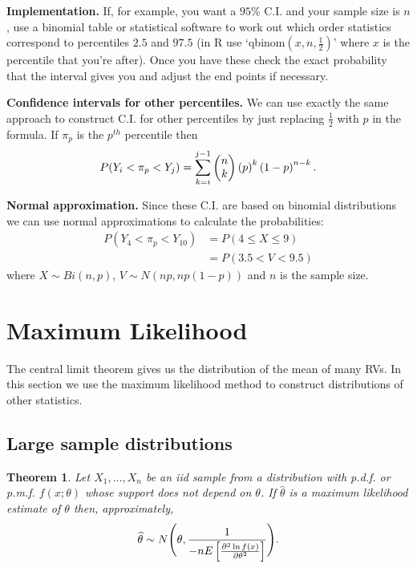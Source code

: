 \documentclass[10pt, two column]{article}
\newtheorem{theorem}{Theorem}[subsection]
\begin{document}
{\bf Implementation.} If, for example, you want a $95\%$ C.I.  and your sample size is $n$, use a binomial table or statistical software to work out which order statistics correspond to percentiles $2.5$ and $97.5$ (in R use `qbinom$(x,n,\frac{1}{2})$' where $x$ is the percentile that you're after). Once you have these check the exact probability that the interval gives you and adjust the end points if necessary. 

{\bf Confidence intervals for other percentiles.} We can use exactly the same approach to construct C.I. for other percentiles by just replacing $\frac{1}{2}$ with $p$ in the formula. If $\pi_{p}$ is the $p^{th}$ percentile then \vspace{-6pt}
\[
P(Y_{i} < \pi_{p} < Y_{j}) = \sum_{k=i}^{j-1} \left( \begin{matrix} n \\ k \end{matrix}\right) \left( p \right)^{k} \left( 1-p \right)^{n-k}.  \vspace{-6pt}
\] 

{\bf Normal approximation.} Since these C.I. are based on binomial distributions we can use normal approximations to calculate the probabilities:
\begin{align*}
P(Y_{4} < \pi_{p} < Y_{10}) &= P(4 \leq X \leq 9) \\
&= P(3.5 < V < 9.5) 
\end{align*}
where $X \sim Bi(n, p)$, $V \sim N(np, np(1-p))$ and $n$ is the sample size. 

\section{Maximum Likelihood}

The central limit theorem gives us the distribution of the mean of many RVs. In this section we use the maximum likelihood method to construct distributions of other statistics. 

\subsection{Large sample distributions}

\begin{theorem}
Let $X_{1}, \dots, X_{n}$ be an iid sample from a distribution with p.d.f. or p.m.f. $f(x;\theta)$ whose support does not depend on $\theta$. If $\widehat{\theta}$ is a maximum likelihood estimate of $\theta$ then, approximately, \vspace{-6pt}
\[
\widehat{\theta} \sim N\Bigg( \theta, \frac{1}{-nE\left[ \frac{\partial^{2} \ln f(x)}{\partial\theta^{2}} \right]} \Bigg).
\vspace{+6pt} \]
\end{theorem}
\end{document}
